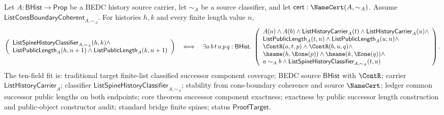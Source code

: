 \begin{theorem}
\label{thm:list-classified-successor-component-exactness}
Let $A:\mathsf{BHist}\to\mathsf{Prop}$ be a BEDC history source carrier, let
$\sim_A$ be a source classifier, and let
$\mathsf{cert}:\NameCert(A,\sim_A)$. Assume
$\mathsf{ListConsBoundaryCoherent}_{A,\sim_A}$. For histories $h,k$ and every
finite length value $n$,
$$
\left(
\begin{array}{l}
\mathsf{ListSpineHistoryClassifier}_{A,\sim_A}(h,k)\land\\
\mathsf{ListPublicLength}_A(h,n+1)\land
\mathsf{ListPublicLength}_A(k,n+1)
\end{array}
\right)
\quad\Longleftrightarrow\quad
\exists a\,b\,t\,u\,p\,q:\mathsf{BHist}.\;
\left(
\begin{array}{l}
A(a)\land A(b)\land
\mathsf{ListHistoryCarrier}_A(t)\land
\mathsf{ListHistoryCarrier}_A(u)\land\\
\mathsf{ListPublicLength}_A(t,n)\land
\mathsf{ListPublicLength}_A(u,n)\land\\
\ContR(a,t,p)\land \ContR(b,u,q)\land\\
\hsame(h,\Eone(p))\land \hsame(k,\Eone(q))\land\\
a\sim_A b\land
\mathsf{ListSpineHistoryClassifier}_{A,\sim_A}(t,u)
\end{array}
\right).
$$
The ten-field fit is: traditional target finite-list classified successor
component coverage; BEDC source $\mathsf{BHist}$ with $\ContR$; carrier
$\mathsf{ListHistoryCarrier}_A$; classifier
$\mathsf{ListSpineHistoryClassifier}_{A,\sim_A}$; stability from
cons-boundary coherence and source $\NameCert$; ledger common successor public
lengths on both endpoints; core theorem successor component exactness;
exactness by public successor length construction and public-object
constructor audit; standard bridge finite spines; status
$\mathsf{ProofTarget}$.
\end{theorem}
